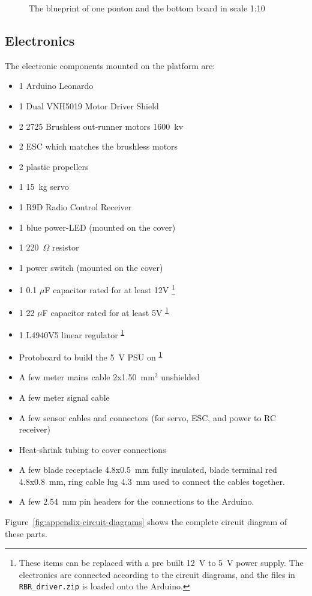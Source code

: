   \begin{figure}
    \centering


    \caption{The blueprint of one ponton and the bottom board in scale 1:10}
    \label{fig:appendix-blueprint-ponton}
\end{figure}
\subsection{Electronics}

The electronic components mounted on the platform are:

\begin{itemize}
  \item 1 Arduino Leonardo
  \item 1 Dual VNH5019 Motor Driver Shield
  \item 2 2725 Brushless out-runner motors 1600~kv
  \item 2 ESC which matches the brushless motors
  \item 2 plastic propellers
  \item 1 15~kg servo
  \item 1 R9D Radio Control Receiver
  \item 1 blue power-LED (mounted on the cover)
  \item 1 220~$\Omega$ resistor
  \item 1 power switch (mounted on the cover)
  \item 1 0.1 $\mu$F capacitor rated for at least 12V \footnote{\label{fotnot_app} These items can be replaced with a pre built 12~V to 5~V power supply. The electronics are connected according to the circuit diagrams, and the files in \texttt{RBR\_driver.zip} is loaded onto the Arduino.} %
  \item 1 22 $\mu$F capacitor rated for at least 5V \textsuperscript{\ref{fotnot_app}}
  \item 1 L4940V5 linear regulator \textsuperscript{\ref{fotnot_app}}%
  \item Protoboard to build the 5~V PSU on \textsuperscript{\ref{fotnot_app}} 
  \item A few meter mains cable 2x1.50~mm$^2$ unshielded
  \item A few meter signal cable
  \item A few sensor cables and connectors (for servo, ESC, and power to RC receiver)
  \item Heat-shrink tubing to cover connections
  \item A few blade receptacle 4.8x0.5~mm fully insulated, blade terminal red
    4.8x0.8~mm, ring cable lug 4.3~mm used to connect the cables together.
  \item A few 2.54~mm pin headers for the connections to the Arduino.
\end{itemize}
 Figure~\ref{fig:appendix-circuit-diagrams} shows the complete circuit diagram of these parts.


